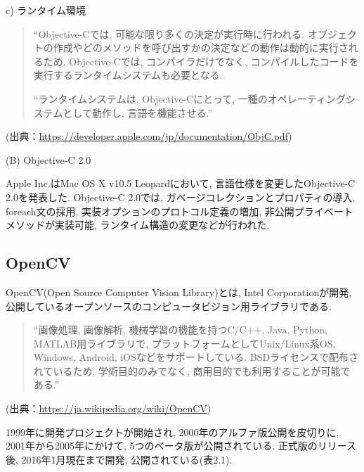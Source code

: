 \begin{description}
\begin{description}
\item c) ランタイム環境

\begin{quotation}
“Objective-Cでは, 可能な限り多くの決定が実行時に行われる.
オブジェクトの作成やどのメソッドを呼び出すかの決定などの動作は動的に実行されるため, Objective-Cでは, コンパイラだけでなく, コンパイルしたコードを実行するランタイムシステムも必要となる.

“ランタイムシステムは, Objective-Cにとって, 一種のオペレーティングシステムとして動作し, 言語を機能させる.”
\end{quotation}
\begin{flushright}
(出典：\url{https://developer.apple.com/jp/documentation/ObjC.pdf})
\end{flushright}

\end{description}

\item (B) Objective-C 2.0

Apple Inc.はMac OS X v10.5 Leopardにおいて, 言語仕様を変更したObjective-C 2.0を発表した.
Objective-C 2.0では, ガベージコレクションとプロパティの導入, foreach文の採用, 実装オプションのプロトコル定義の増加, 非公開プライベートメソッドが実装可能, ランタイム構造の変更などが行われた.
\end{description}

\subsection{OpenCV}
OpenCV(Open Source Computer Vision Library)とは, Intel Corporationが開発, 公開しているオープンソースのコンピュータビジョン用ライブラリである.

\begin{quotation}
“画像処理, 画像解析, 機械学習の機能を持つC/C++, Java, Python, MATLAB用ライブラリで, プラットフォームとしてUnix/Linux系OS, Windows, Android, iOSなどをサポートしている.
BSDライセンスで配布されているため, 学術目的のみでなく, 商用目的でも利用することが可能である.”
\end{quotation}
\begin{flushright}
(出典：\url{https://ja.wikipedia.org/wiki/OpenCV})
\end{flushright}

1999年に開発プロジェクトが開始され, 2000年のアルファ版公開を皮切りに, 2001年から2005年にかけて, 5つのベータ版が公開されている.
正式版のリリース後, 2016年1月現在まで開発, 公開されている(表2.1).

